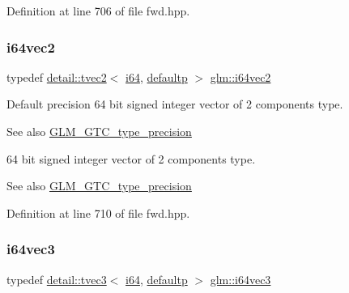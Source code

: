 Definition at line 706 of file fwd.\+hpp.

\mbox{\label{group__gtc__type__precision_ga75461c98baf3e3913566550bd9d8d17f}} 
\subsubsection{\texorpdfstring{i64vec2}{i64vec2}}
{\footnotesize\ttfamily typedef \hyperlink{structglm_1_1detail_1_1tvec2}{detail\+::tvec2}$<$ \hyperlink{group__gtc__type__precision_gac7a7eaad46064fc952b06df33689da23}{i64}, \hyperlink{namespaceglm_a0f04f086094c747d227af4425893f545a9d21ccd8b5a009ec7eb7677befc3bf51}{defaultp} $>$ \hyperlink{group__gtc__type__precision_ga75461c98baf3e3913566550bd9d8d17f}{glm\+::i64vec2}}

Default precision 64 bit signed integer vector of 2 components type. \begin{DoxySeeAlso}{See also}
\hyperlink{group__gtc__type__precision}{G\+L\+M\+\_\+\+G\+T\+C\+\_\+type\+\_\+precision}
\end{DoxySeeAlso}
64 bit signed integer vector of 2 components type. \begin{DoxySeeAlso}{See also}
\hyperlink{group__gtc__type__precision}{G\+L\+M\+\_\+\+G\+T\+C\+\_\+type\+\_\+precision} 
\end{DoxySeeAlso}


Definition at line 710 of file fwd.\+hpp.

\mbox{\label{group__gtc__type__precision_gab6eefcd7eb24e4142ed23dc1e87163a6}} 
\subsubsection{\texorpdfstring{i64vec3}{i64vec3}}
{\footnotesize\ttfamily typedef \hyperlink{structglm_1_1detail_1_1tvec3}{detail\+::tvec3}$<$ \hyperlink{group__gtc__type__precision_gac7a7eaad46064fc952b06df33689da23}{i64}, \hyperlink{namespaceglm_a0f04f086094c747d227af4425893f545a9d21ccd8b5a009ec7eb7677befc3bf51}{defaultp} $>$ \hyperlink{group__gtc__type__precision_gab6eefcd7eb24e4142ed23dc1e87163a6}{glm\+::i64vec3}}

